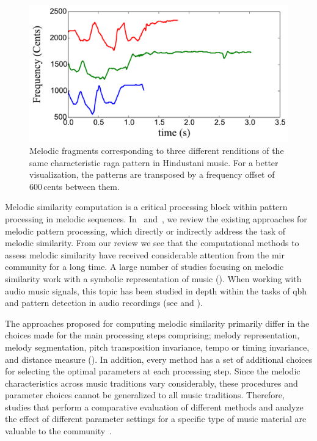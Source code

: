 \begin{figure}
	\begin{center}
		\includegraphics[width=\figSizeSixty]{ch06_patterns/figures/SimilarityEvaluation/Hindustani3Patts.pdf}
	\end{center}
	\caption[Example of difference occurrences of a melodic pattern]{Melodic fragments corresponding to three different renditions of the same characteristic \gls{raga} pattern in Hindustani music. For a better visualization, the patterns are transposed by a frequency offset of 600\,cents between them.}
	\label{fig:examples_3_phrases}
\end{figure}

Melodic similarity computation is a critical processing block within pattern processing in melodic sequences. In~ and~, we review the existing approaches for melodic pattern processing, which directly or indirectly address the task of melodic similarity. From our review we see that the computational methods to assess melodic similarity have received considerable attention from the \gls{mir} community for a long time. A large number of studies focusing on melodic similarity work with a symbolic representation of music (). When working with audio music signals, this topic has been studied in depth within the tasks of \acrfull{qbh} and pattern detection in audio recordings (see  and ).

The approaches proposed for computing melodic similarity primarily differ in the choices made for the main processing steps comprising; melody representation, melody segmentation, pitch transposition invariance, tempo or timing invariance, and distance measure (). In addition, every method has a  set of additional choices for selecting the optimal parameters at each processing step. Since the melodic characteristics across music traditions vary considerably, these procedures and parameter choices cannot be generalized to all music traditions. Therefore, studies that perform a comparative evaluation of different methods and analyze the effect of different parameter settings for a specific type of music material are valuable to the community~\citep{RBDannenberg2007QBH,Rao2014,XavierSerra2011}.

